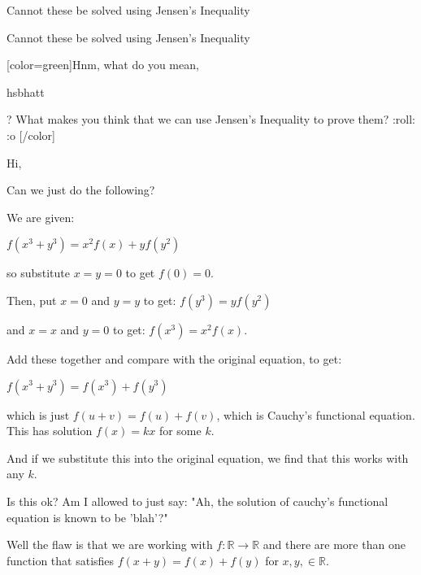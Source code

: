 \begin{mysolution}
	Cannot these be solved using Jensen's Inequality
\end{mysolution}



\begin{mysolution}
	\begin{tcolorbox}Cannot these be solved using Jensen's Inequality\end{tcolorbox}
[color=green]Hnm, what do you mean, \begin{bolded}hsbhatt\end{bolded}? What makes you think that we can use Jensen's Inequality to prove them?  :roll:  :o [/color]
\end{mysolution}



\begin{mysolution}
	Hi,

Can we just do the following?

We are given:

$ f(x^{3}+y^{3}) = x^{2}f(x) + yf(y^2)$

so substitute $ x=y=0$ to get $ f(0)=0$.

Then, put $ x=0$ and $ y=y$ to get: $ f(y^{3}) = y f(y^{2})$

and $ x=x$ and $ y=0$ to get: $ f(x^{3}) = x^{2}f(x)$.

Add these together and compare with the original equation, to get:

$ f(x^{3}+y^{3}) = f(x^{3}) + f(y^{3})$

which is just $ f(u+v) = f(u)+f(v)$, which is Cauchy's functional equation. This has solution $ f(x)=kx$ for some $ k$.

And if we substitute this into the original equation, we find that this works with any $ k$.

Is this ok? Am I allowed to just say: "Ah, the solution of cauchy's functional equation is known to be 'blah'?"
\end{mysolution}



\begin{mysolution}
	Well the flaw is that we are working with $ f: \mathbb{R} \rightarrow \mathbb{R}$ and there are more than one function that satisfies $ f(x+y) = f(x) + f(y)$ for $ x,y, \in \mathbb{R}$.
\end{mysolution}



